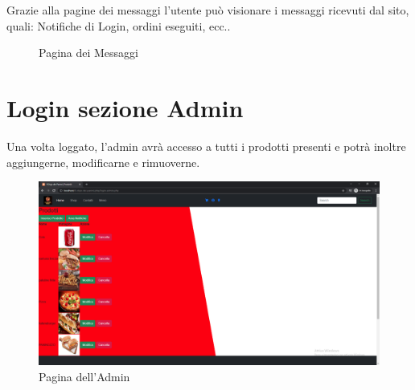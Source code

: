 \documentclass[a4paper,12pt]{report}
\begin{document}
	\textsf{\small Grazie alla pagine dei messaggi l'utente può visionare i messaggi ricevuti dal sito, quali: Notifiche di Login, ordini eseguiti, ecc..}\\
	
	\begin{figure}[H] 
		\centering
		\caption{Pagina dei Messaggi}
		\label{fig:messaggi}
	\end{figure}
	
	
	\newpage
	
	\section{Login sezione Admin}
	
	\textsf{\small Una volta loggato, l'admin avrà accesso a tutti i prodotti presenti e potrà inoltre aggiungerne, modificarne e rimuoverne.}\\
	
	\begin{figure}[H] 
		\centering
		\includegraphics[width=1\textwidth, height=1\textheight, keepaspectratio]{./Images/Admin.png}
		\caption{Pagina dell'Admin}
		\label{fig:admin}
	\end{figure}
\end{document}
